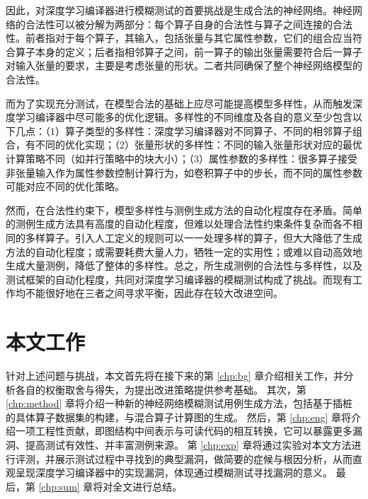 因此，对深度学习编译器进行模糊测试的首要挑战是生成合法的神经网络。神经网络的合法性可以被分解为两部分：每个算子自身的合法性与算子之间连接的合法性。前者指对于每个算子，其输入，包括张量与其它属性参数，它们的组合应当符合算子本身的定义；后者指相邻算子之间，前一算子的输出张量需要符合后一算子对输入张量的要求，主要是考虑张量的形状。二者共同确保了整个神经网络模型的合法性。

而为了实现充分测试，在模型合法的基础上应尽可能提高模型多样性，从而触发深度学习编译器中尽可能多的优化逻辑。多样性的不同维度及各自的意义至少包含以下几点：（1）算子类型的多样性：深度学习编译器对不同算子、不同的相邻算子组合，有不同的优化实现；（2）张量形状的多样性：不同的输入张量形状对应的最优计算策略不同（如并行策略中的块大小）；（3）属性参数的多样性：很多算子接受非张量输入作为属性参数控制计算行为，如卷积算子中的步长，而不同的属性参数可能对应不同的优化策略。

然而，在合法性约束下，模型多样性与测例生成方法的自动化程度存在矛盾。简单的测例生成方法具有高度的自动化程度，但难以处理合法性约束条件复杂而各不相同的多样算子。引入人工定义的规则可以一一处理多样的算子，但大大降低了生成方法的自动化程度；或需要耗费大量人力，牺牲一定的实用性；或难以自动高效地生成大量测例，降低了整体的多样性。总之，所生成测例的合法性与多样性，以及测试框架的自动化程度，共同对深度学习编译器的模糊测试构成了挑战。而现有工作均不能很好地在三者之间寻求平衡，因此存在较大改进空间。

\section{本文工作}
针对上述问题与挑战，本文首先将在接下来的第 \ref{chp:bg} 章介绍相关工作，并分析各自的权衡取舍与得失，为提出改进策略提供参考基础。
其次，第 \ref{chp:method} 章将介绍一种新的神经网络模糊测试用例生成方法，包括基于插桩的具体算子数据集的构建，与混合算子计算图的生成。
然后，第 \ref{chp:eng} 章将介绍一项工程性贡献，即图结构中间表示与可读代码的相互转换，它可以暴露更多漏洞、提高测试有效性、并丰富测例来源。
第 \ref{chp:exp} 章将通过实验对本文方法进行评测，并展示测试过程中寻找到的典型漏洞，做简要的症候与根因分析，从而直观呈现深度学习编译器中的实现漏洞，体现通过模糊测试寻找漏洞的意义。
最后，第 \ref{chp:sum} 章将对全文进行总结。

